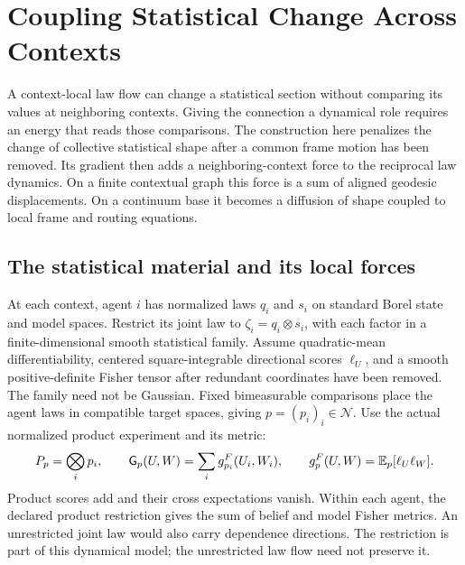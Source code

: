 \chapter{Coupling Statistical Change Across Contexts}
\label{comp:contextual-coupling}

A context-local law flow can change a statistical section without comparing its values at neighboring contexts. Giving the connection a dynamical role requires an energy that reads those comparisons. The construction here penalizes the change of collective statistical shape after a common frame motion has been removed. Its gradient then adds a neighboring-context force to the reciprocal law dynamics. On a finite contextual graph this force is a sum of aligned geodesic displacements. On a continuum base it becomes a diffusion of shape coupled to local frame and routing equations.

\section{The statistical material and its local forces}

At each context, agent $i$ has normalized laws $q_i$ and $s_i$ on standard Borel state and model spaces. Restrict its joint law to $\zeta_i=q_i\otimes s_i$, with each factor in a finite-dimensional smooth statistical family. Assume quadratic-mean differentiability, centered square-integrable directional scores $\ell_U$, and a smooth positive-definite Fisher tensor after redundant coordinates have been removed. The family need not be Gaussian. Fixed bimeasurable comparisons place the agent laws in compatible target spaces, giving $p=(p_i)_i\in\mathcal N$. Use the actual normalized product experiment and its metric:
\begin{equation}
 P_p=\bigotimes_i p_i,\qquad
 \mathsf G_p(U,W)=\sum_i g^F_{p_i}(U_i,W_i),\qquad
 g^F_p(U,W)=\mathbb E_p[\ell_U\ell_W].
 \label{comp:ctx:metric}
\end{equation}
Product scores add and their cross expectations vanish. Within each agent, the declared product restriction gives the sum of belief and model Fisher metrics. An unrestricted joint law would also carry dependence directions. The restriction is part of this dynamical model; the unrestricted law flow need not preserve it.

